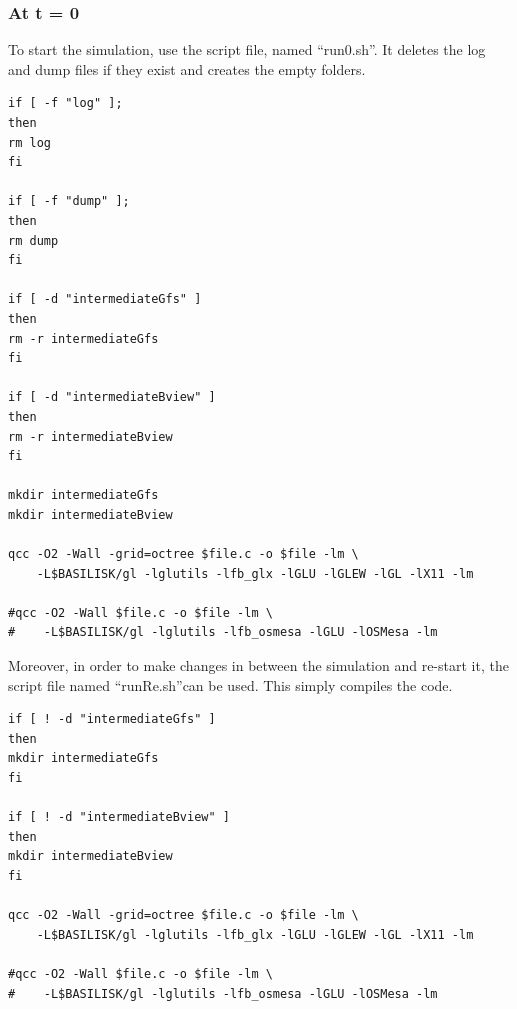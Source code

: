 \documentclass[]{article}
\begin{document}
\subsubsection{At t = 0}
To start the simulation, use the script file, named \textquotedblleft run0.sh\textquotedblright. It deletes the log and dump files if they exist and creates the empty folders. 
\begin{verbatim}
if [ -f "log" ];
then
rm log
fi

if [ -f "dump" ];
then
rm dump
fi

if [ -d "intermediateGfs" ]
then
rm -r intermediateGfs
fi

if [ -d "intermediateBview" ]
then
rm -r intermediateBview
fi

mkdir intermediateGfs
mkdir intermediateBview

qcc -O2 -Wall -grid=octree $file.c -o $file -lm \
    -L$BASILISK/gl -lglutils -lfb_glx -lGLU -lGLEW -lGL -lX11 -lm

#qcc -O2 -Wall $file.c -o $file -lm \
#    -L$BASILISK/gl -lglutils -lfb_osmesa -lGLU -lOSMesa -lm
\end{verbatim}
Moreover, in order to make changes in between the simulation and re-start it, the script file named \textquotedblleft runRe.sh\textquotedblright can be used. This simply compiles the code. 
\begin{verbatim}
if [ ! -d "intermediateGfs" ]
then
mkdir intermediateGfs
fi

if [ ! -d "intermediateBview" ]
then
mkdir intermediateBview
fi

qcc -O2 -Wall -grid=octree $file.c -o $file -lm \
    -L$BASILISK/gl -lglutils -lfb_glx -lGLU -lGLEW -lGL -lX11 -lm

#qcc -O2 -Wall $file.c -o $file -lm \
#    -L$BASILISK/gl -lglutils -lfb_osmesa -lGLU -lOSMesa -lm
\end{verbatim}
\end{document}
